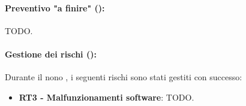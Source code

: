 \paragraph*{Preventivo "a finire" ():}
\par TODO.

\paragraph*{Gestione dei rischi ():}
\par Durante il nono , i seguenti rischi sono stati gestiti con successo:
\begin{itemize}
  \item \textbf{RT3 - Malfunzionamenti software}: TODO.
\end{itemize}